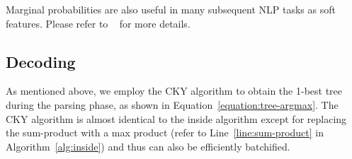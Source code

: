 \documentclass{article}
\begin{document}
Marginal probabilities are also useful in many subsequent NLP tasks as soft features.
Please refer to \citeauthor{eisner-2016-inside}~ for more details.

\subsection{Decoding}

As mentioned above, we employ the CKY algorithm to obtain the 1-best tree during the parsing phase, as shown in Equation~\ref{equation:tree-argmax}.
The CKY algorithm is almost identical to the inside algorithm except for replacing the sum-product with a max product (refer to Line~\ref{line:sum-product} in Algorithm~\ref{alg:inside}) and thus can also be efficiently batchified.
\end{document}
